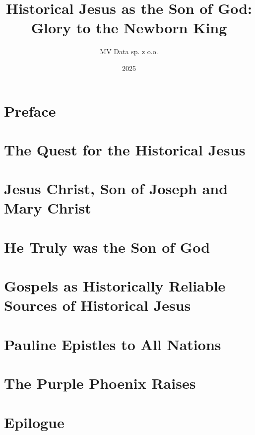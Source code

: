 \documentclass[12pt]{book}
\title{Historical Jesus as the Son of God: Glory to the Newborn King}
\author{MV Data sp. z o.o.}
\date{2025}
\begin{document}
\maketitle

\tableofcontents

\chapter*{Preface}


\chapter{The Quest for the Historical Jesus}\label{ch:the-quest-for-the-historical-jesus}


\chapter{Jesus Christ, Son of Joseph and Mary Christ}\label{ch:jesus-christ-son-of-joseph-and-mary-christ}


\chapter{He Truly was the Son of God}\label{ch:he-truly-was-the-son-of-god}


\chapter{Gospels as Historically Reliable Sources of Historical Jesus}\label{ch:gospels-are-historically-reliable}


\chapter{Pauline Epistles to All Nations}\label{ch:pauline-epistles-to-all-nations}


\chapter{The Purple Phoenix Raises}\label{ch:the-purple-phoenix-raises}


\chapter*{Epilogue}

\end{document}

